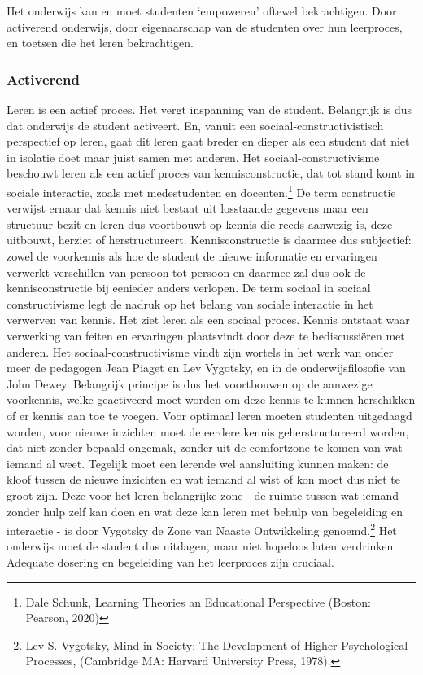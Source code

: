 \documentclass{jote-book}
\begin{document}
	Het onderwijs kan en moet studenten ‘empoweren' oftewel bekrachtigen. Door activerend onderwijs, door eigenaarschap van de studenten over hun leerproces, en toetsen die het leren bekrachtigen.



	\subsubsection{Activerend}



	Leren is een actief proces. Het vergt inspanning van de student. Belangrijk is dus dat onderwijs de student activeert. En, vanuit een sociaal-constructivistisch perspectief op leren, gaat dit leren gaat breder en dieper als een student dat niet in isolatie doet maar juist samen met anderen. Het sociaal-constructivisme beschouwt leren als een actief proces van kennisconstructie, dat tot stand komt in sociale interactie, zoals met medestudenten en docenten.\footnote{Dale Schunk, Learning Theories an Educational Perspective (Boston: Pearson, 2020)} De term constructie verwijst ernaar dat kennis niet bestaat uit losstaande gegevens maar een structuur bezit en leren dus voortbouwt op kennis die reeds aanwezig is, deze uitbouwt, herziet of herstructureert. Kennisconstructie is daarmee dus subjectief: zowel de voorkennis als hoe de student de nieuwe informatie en ervaringen verwerkt verschillen van persoon tot persoon en daarmee zal dus ook de kennisconstructie bij eenieder anders verlopen. De term sociaal in sociaal constructivisme legt de nadruk op het belang van sociale interactie in het verwerven van kennis. Het ziet leren als een sociaal proces. Kennis ontstaat waar verwerking van feiten en ervaringen plaatsvindt door deze te bediscussiëren met anderen. Het sociaal-constructivisme vindt zijn wortels in het werk van onder meer de pedagogen Jean Piaget en Lev Vygotsky, en in de onderwijsfilosofie van John Dewey. Belangrijk principe is dus het voortbouwen op de aanwezige voorkennis, welke geactiveerd moet worden om deze kennis te kunnen herschikken of er kennis aan toe te voegen. Voor optimaal leren moeten studenten uitgedaagd worden, voor nieuwe inzichten moet de eerdere kennis geherstructureerd worden, dat niet zonder bepaald ongemak, zonder uit de comfortzone te komen van wat iemand al weet. Tegelijk moet een lerende wel aansluiting kunnen maken: de kloof tussen de nieuwe inzichten en wat iemand al wist of kon moet dus niet te groot zijn. Deze voor het leren belangrijke zone - de ruimte tussen wat iemand zonder hulp zelf kan doen en wat deze kan leren met behulp van begeleiding en interactie - is door Vygotsky de Zone van Naaste Ontwikkeling genoemd.\footnote{Lev S. Vygotsky, Mind in Society: The Development of Higher Psychological Processes, (Cambridge MA: Harvard University Press, 1978).} Het onderwijs moet de student dus uitdagen, maar niet hopeloos laten verdrinken. Adequate dosering en begeleiding van het leerproces zijn cruciaal.
\end{document}
